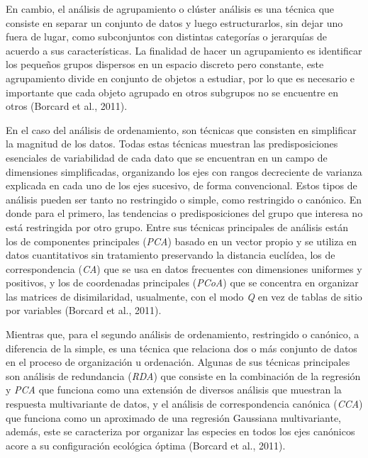 \documentclass[11pt,]{article}
\begin{document}
En cambio, el análisis de agrupamiento o clúster análisis es una técnica
que consiste en separar un conjunto de datos y luego estructurarlos, sin
dejar uno fuera de lugar, como subconjuntos con distintas categorías o
jerarquías de acuerdo a sus características. La finalidad de hacer un
agrupamiento es identificar los pequeños grupos dispersos en un espacio
discreto pero constante, este agrupamiento divide en conjunto de objetos
a estudiar, por lo que es necesario e importante que cada objeto
agrupado en otros subgrupos no se encuentre en otros (Borcard et al.,
2011).

En el caso del análisis de ordenamiento, son técnicas que consisten en
simplificar la magnitud de los datos. Todas estas técnicas muestran las
predisposiciones esenciales de variabilidad de cada dato que se
encuentran en un campo de dimensiones simplificadas, organizando los
ejes con rangos decreciente de varianza explicada en cada uno de los
ejes sucesivo, de forma convencional. Estos tipos de análisis pueden ser
tanto no restringido o simple, como restringido o canónico. En donde
para el primero, las tendencias o predisposiciones del grupo que
interesa no está restringida por otro grupo. Entre sus técnicas
principales de análisis están los de componentes principales
(\emph{PCA}) basado en un vector propio y se utiliza en datos
cuantitativos sin tratamiento preservando la distancia euclídea, los de
correspondencia (\emph{CA}) que se usa en datos frecuentes con
dimensiones uniformes y positivos, y los de coordenadas principales
(\emph{PCoA}) que se concentra en organizar las matrices de
disimilaridad, usualmente, con el modo \emph{Q} en vez de tablas de
sitio por variables (Borcard et al., 2011).

Mientras que, para el segundo análisis de ordenamiento, restringido o
canónico, a diferencia de la simple, es una técnica que relaciona dos o
más conjunto de datos en el proceso de organización u ordenación.
Algunas de sus técnicas principales son análisis de redundancia
(\emph{RDA}) que consiste en la combinación de la regresión y \emph{PCA}
que funciona como una extensión de diversos análisis que muestran la
respuesta multivariante de datos, y el análisis de correspondencia
canónica (\emph{CCA}) que funciona como un aproximado de una regresión
Gaussiana multivariante, además, este se caracteriza por organizar las
especies en todos los ejes canónicos acore a su configuración ecológica
óptima (Borcard et al., 2011).
\end{document}
